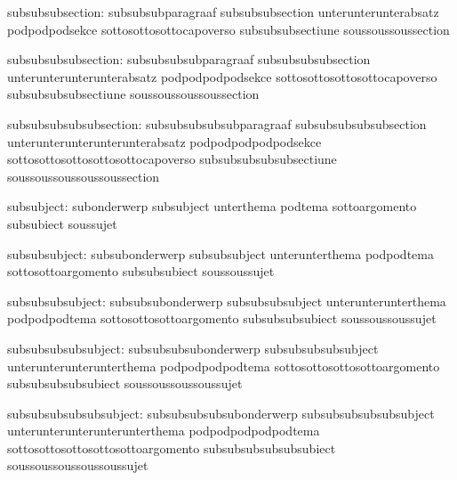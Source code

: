       subsubsubsection: subsubsubparagraaf                       subsubsubsection
                        unterunterunterabsatz                    podpodpodsekce
                        sottosottosottocapoverso                 subsubsubsectiune
                        soussoussoussection

   subsubsubsubsection: subsubsubsubparagraaf                    subsubsubsubsection
                        unterunterunterunterabsatz               podpodpodpodsekce
                        sottosottosottosottocapoverso            subsubsubsubsectiune
                        soussoussoussoussection

subsubsubsubsubsection: subsubsubsubsubparagraaf                 subsubsubsubsubsection
                        unterunterunterunterunterabsatz          podpodpodpodpodsekce
                        sottosottosottosottosottocapoverso       subsubsubsubsubsectiune
                        soussoussoussoussoussection

            subsubject: subonderwerp                             subsubject
                        unterthema                               podtema
                        sottoargomento                           subsubiect
                        soussujet

         subsubsubject: subsubonderwerp                          subsubsubject
                        unterunterthema                          podpodtema
                        sottosottoargomento                      subsubsubiect
                        soussoussujet

      subsubsubsubject: subsubsubonderwerp                       subsubsubsubject
                        unterunterunterthema                     podpodpodtema
                        sottosottosottoargomento                 subsubsubsubiect
                        soussoussoussujet

   subsubsubsubsubject: subsubsubsubonderwerp                    subsubsubsubsubject
                        unterunterunterunterthema                podpodpodpodtema
                        sottosottosottosottoargomento            subsubsubsubsubiect
                        soussoussoussoussujet

subsubsubsubsubsubject: subsubsubsubsubonderwerp                 subsubsubsubsubsubject
                        unterunterunterunterunterthema           podpodpodpodpodtema
                        sottosottosottosottosottoargomento       subsubsubsubsubsubiect
                        soussoussoussoussoussujet

